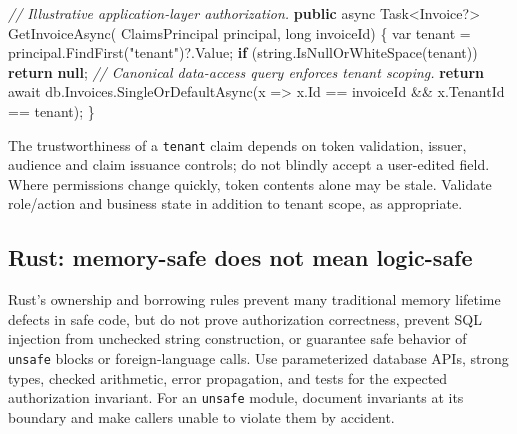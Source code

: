 \documentclass[
  letterpaper,
]{article}
\newenvironment{Shaded}{}{}
\newcommand{\CommentTok}[1]{\textcolor[rgb]{0.38,0.63,0.69}{\textit{#1}}}
\newcommand{\DataTypeTok}[1]{\textcolor[rgb]{0.56,0.13,0.00}{#1}}
\newcommand{\FunctionTok}[1]{\textcolor[rgb]{0.02,0.16,0.49}{#1}}
\newcommand{\KeywordTok}[1]{\textcolor[rgb]{0.00,0.44,0.13}{\textbf{#1}}}
\newcommand{\NormalTok}[1]{#1}
\newcommand{\OperatorTok}[1]{\textcolor[rgb]{0.40,0.40,0.40}{#1}}
\newcommand{\StringTok}[1]{\textcolor[rgb]{0.25,0.44,0.63}{#1}}
\begin{document}
\begin{Shaded}
\begin{Highlighting}[]
\CommentTok{// Illustrative application{-}layer authorization.}
\KeywordTok{public}\NormalTok{ async Task}\OperatorTok{\textless{}}\NormalTok{Invoice}\OperatorTok{?\textgreater{}} \FunctionTok{GetInvoiceAsync}\OperatorTok{(}
\NormalTok{    ClaimsPrincipal principal}\OperatorTok{,} \DataTypeTok{long}\NormalTok{ invoiceId}\OperatorTok{)} \OperatorTok{\{}
    \DataTypeTok{var}\NormalTok{ tenant }\OperatorTok{=}\NormalTok{ principal}\OperatorTok{.}\FunctionTok{FindFirst}\OperatorTok{(}\StringTok{"tenant"}\OperatorTok{)?.}\FunctionTok{Value}\OperatorTok{;}
    \KeywordTok{if} \OperatorTok{(}\DataTypeTok{string}\OperatorTok{.}\FunctionTok{IsNullOrWhiteSpace}\OperatorTok{(}\NormalTok{tenant}\OperatorTok{))} \KeywordTok{return} \KeywordTok{null}\OperatorTok{;}
    \CommentTok{// Canonical data{-}access query enforces tenant scoping.}
    \KeywordTok{return}\NormalTok{ await db}\OperatorTok{.}\FunctionTok{Invoices}\OperatorTok{.}\FunctionTok{SingleOrDefaultAsync}\OperatorTok{(}\NormalTok{x }\OperatorTok{=\textgreater{}}
\NormalTok{        x}\OperatorTok{.}\FunctionTok{Id} \OperatorTok{==}\NormalTok{ invoiceId }\OperatorTok{\&\&}\NormalTok{ x}\OperatorTok{.}\FunctionTok{TenantId} \OperatorTok{==}\NormalTok{ tenant}\OperatorTok{);}
\OperatorTok{\}}
\end{Highlighting}
\end{Shaded}

The trustworthiness of a \texttt{tenant} claim depends on token
validation, issuer, audience and claim issuance controls; do not blindly
accept a user-edited field. Where permissions change quickly, token
contents alone may be stale. Validate role/action and business state in
addition to tenant scope, as appropriate.

\subsection{Rust: memory-safe does not mean
logic-safe}\label{rust-memory-safe-does-not-mean-logic-safe}

Rust's ownership and borrowing rules prevent many traditional memory
lifetime defects in safe code, but do not prove authorization
correctness, prevent SQL injection from unchecked string construction,
or guarantee safe behavior of \texttt{unsafe} blocks or foreign-language
calls. Use parameterized database APIs, strong types, checked
arithmetic, error propagation, and tests for the expected authorization
invariant. For an \texttt{unsafe} module, document invariants at its
boundary and make callers unable to violate them by accident.
\end{document}
